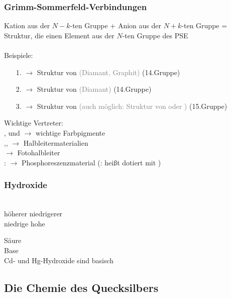 \documentclass{article}
\begin{document}
\subsubsection*{Grimm-Sommerfeld-Verbindungen}
Kation aus der $N-k$-ten Gruppe + Anion aus der $N+k$-ten Gruppe = Struktur, die einen Element aus der $N$-ten Gruppe des PSE\\\\
Beispiele:\\
\begin{itemize}
    \item[1.]  $\rightarrow$ Struktur von  \textcolor{gray}{(Diamant, Graphit)} (14.Gruppe)
    \item[2.]  $\rightarrow$ Struktur von  \textcolor{gray}{(Diamant)} (14.Gruppe)
    \item[3.]  $\rightarrow$ Struktur von  \textcolor{gray}{(auch möglich: Struktur von  oder )} (15.Gruppe)
\end{itemize}
Wichtige Vertreter:\\
, und  $\rightarrow$ wichtige Farbpigmente\\
,, $\rightarrow$ Halbleitermaterialien\\
 $\rightarrow$ Fotohalbleiter\\
: $\rightarrow$ Phosphoreszenzmaterial (: heißt dotiert mit )

\subsubsection*{Hydroxide}
\begin{center}
    \\
    höherer  niedrigerer\\
    niedrige \ce{->[{Löslichkeit}]} hohe
\end{center}

\begin{center}
     Säure\\
     Base\\
    Cd- und Hg-Hydroxide sind basisch
\end{center}

\subsection{Die Chemie des Quecksilbers}
\end{document}
